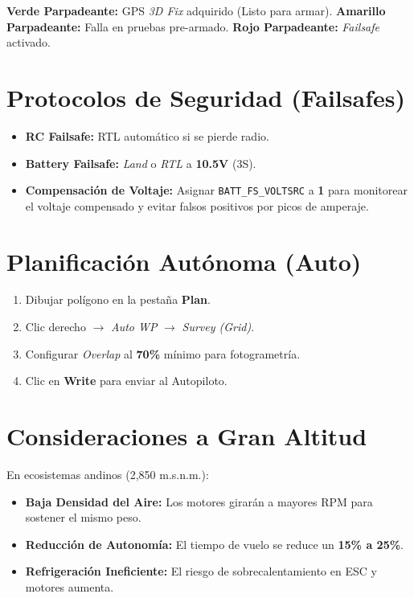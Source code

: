 \documentclass[11pt,a4paper]{article}
\begin{document}
\begin{infobox}[title=Diagnóstico LED del Cube]
\textbf{Verde Parpadeante:} GPS \textit{3D Fix} adquirido (Listo para armar). \textbf{Amarillo Parpadeante:} Falla en pruebas pre-armado. \textbf{Rojo Parpadeante:} \textit{Failsafe} activado.
\end{infobox}

\section{Protocolos de Seguridad (Failsafes)}
\begin{itemize}[leftmargin=*,noitemsep]
    \item \textbf{RC Failsafe:} RTL automático si se pierde radio.
    \item \textbf{Battery Failsafe:} \textit{Land} o \textit{RTL} a \textbf{10.5V} (3S).
    \item \textbf{Compensación de Voltaje:} Asignar \texttt{BATT\_FS\_VOLTSRC} a \textbf{1} para monitorear el voltaje compensado y evitar falsos positivos por picos de amperaje.
\end{itemize}

\section{Planificación Autónoma (Auto)}
\begin{enumerate}[leftmargin=*,noitemsep]
    \item Dibujar polígono en la pestaña \textbf{Plan}.
    \item Clic derecho $\rightarrow$ \textit{Auto WP} $\rightarrow$ \textit{Survey (Grid)}.
    \item Configurar \textit{Overlap} al \textbf{70\%} mínimo para fotogrametría.
    \item Clic en \textbf{Write} para enviar al Autopiloto.
\end{enumerate}

\section{Consideraciones a Gran Altitud}
En ecosistemas andinos (2,850 m.s.n.m.):
\begin{itemize}[leftmargin=*,noitemsep]
    \item \textbf{Baja Densidad del Aire:} Los motores girarán a mayores RPM para sostener el mismo peso.
    \item \textbf{Reducción de Autonomía:} El tiempo de vuelo se reduce un \textbf{15\% a 25\%}.
    \item \textbf{Refrigeración Ineficiente:} El riesgo de sobrecalentamiento en ESC y motores aumenta.
\end{itemize}
\end{document}
